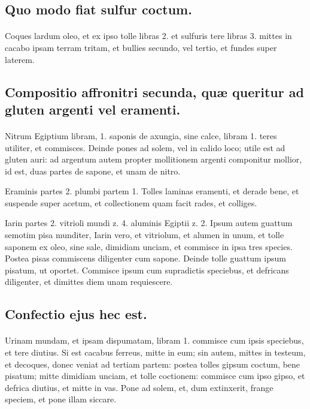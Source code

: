 \documentclass[a4paper, 11pt, oneside, polutonikogreek, italian]{article}
\begin{document}
\subsection{Quo modo fiat sulfur coctum.}
\paragraph{}
Coques lardum oleo, et ex ipso tolle libras 2. et sulfuris tere libras 3. mittes in cacabo ipsam terram tritam, et bullies secundo, vel tertio, et fundes super laterem.

\subsection{Compositio affronitri secunda, quæ queritur ad gluten argenti vel eramenti.}
\paragraph{}
Nitrum Egiptium libram, 1. saponis de axungia, sine calce, libram 1. teres utiliter, et commisces. Deinde pones ad solem, vel in calido loco; utile est ad gluten auri: ad argentum autem propter mollitionem argenti componitur mollior, id est, duas partes de sapone, et unam de nitro.

Eraminis partes 2. plumbi partem 1. Tolles laminas eramenti, et derade bene, et suspende super acetum, et collectionem quam facit rades, et colliges.

Iarin partes 2. vitrioli mundi z. 4. aluminis Egiptii z. 2. Ipsum autem guattum semotim pisa munditer, Iarin vero, et vitriolum, et alumen in unum, et tolle saponem ex oleo, sine sale, dimidiam unciam, et commisce in ipsa tres species. Postea pisas commiscens diligenter cum sapone. Deinde tolle guattum ipsum pisatum, ut oportet. Commisce ipsum cum supradictis speciebus, et defricans diligenter, et dimittes diem unam requiescere.

\subsection{Confectio ejus hec est.}
\paragraph{}
Urinam mundam, et ipsam dispumatam, libram 1. commisce cum ipsis speciebus, et tere diutius. Si est cacabus ferreus, mitte in eum; sin autem, mittes in testeum, et decoques, donec veniat ad tertiam partem: postea tolles gipsum coctum, bene pisatum; mitte dimidiam unciam, et tolle coctionem: commisce cum ipso gipso, et defrica diutius, et mitte in vas. Pone ad solem, et, dum extinxerit, frange speciem, et pone illam siccare.
\end{document}
